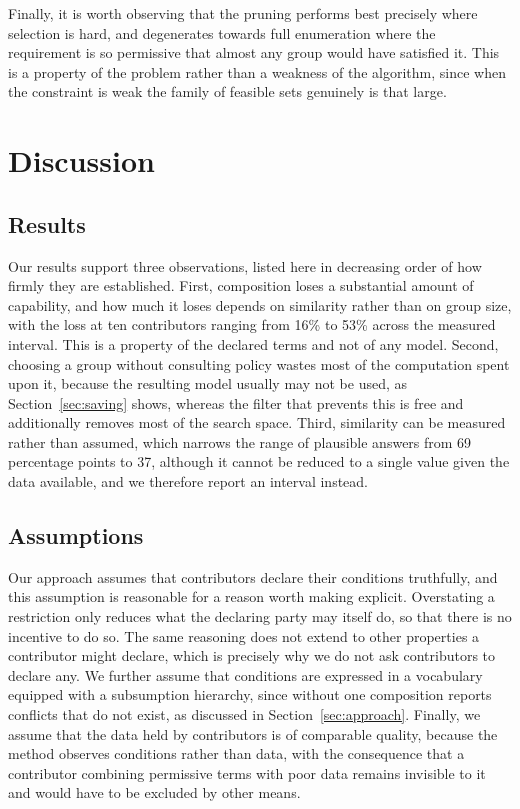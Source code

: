 \documentclass[sigconf,anonymous,review]{acmart}
\begin{document}
Finally, it is worth observing that the pruning performs best precisely where
selection is hard, and degenerates towards full enumeration where the requirement
is so permissive that almost any group would have satisfied it. This is a
property of the problem rather than a weakness of the algorithm, since when the
constraint is weak the family of feasible sets genuinely is that large.

\section{Discussion}
\label{sec:discussion}

\subsection{Results}

Our results support three observations, listed here in decreasing order of how
firmly they are established. First, composition loses a substantial amount of
capability, and how much it loses depends on similarity rather than on group
size, with the loss at ten contributors ranging from 16\% to 53\% across the
measured interval. This is a property of the declared terms and not of any model.
Second, choosing a group without consulting policy wastes most of the computation
spent upon it, because the resulting model usually may not be used, as
Section~\ref{sec:saving} shows, whereas the filter that prevents this is free and
additionally removes most of the search space. Third, similarity can be measured
rather than assumed, which narrows the range of plausible answers from 69
percentage points to 37, although it cannot be reduced to a single value given
the data available, and we therefore report an interval instead.

\subsection{Assumptions}

Our approach assumes that contributors declare their conditions truthfully, and
this assumption is reasonable for a reason worth making explicit. Overstating a
restriction only reduces what the declaring party may itself do, so that there is
no incentive to do so. The same reasoning does not extend to other properties a
contributor might declare, which is precisely why we do not ask contributors to
declare any. We further assume that conditions are expressed in a vocabulary
equipped with a subsumption hierarchy, since without one composition reports
conflicts that do not exist, as discussed in Section~\ref{sec:approach}. Finally,
we assume that the data held by contributors is of comparable quality, because
the method observes conditions rather than data, with the consequence that a
contributor combining permissive terms with poor data remains invisible to it and
would have to be excluded by other means.
\end{document}
